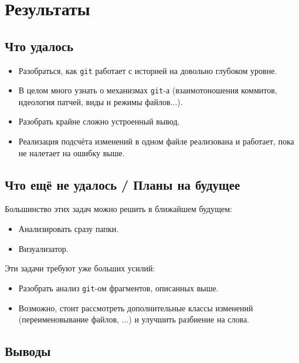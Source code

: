 \documentclass{beamer}
\makeatletter
\newcommand*{\currentname}{\@currentlabelname}
\def\t{\texttt}
\makeatother
\begin{document}
\section{Результаты}
\subsection{Что удалось}

\begin{frame}[t]{\currentname}
	\pause
	\begin{itemize}
	\item
		Разобраться, как \t{git} работает с историей на довольно глубоком уровне.
		\pause
	\item
		В целом много узнать о механизмах \t{git}-а (взаимотоношения коммитов, идеология патчей, виды и режимы файлов...).
		\pause
	\item
		Разобрать крайне сложно устроенный вывод.
		\pause
	\item
		Реализация подсчёта изменений в одном файле реализована и работает, пока не налетает на ошибку выше.
	\end{itemize}
\end{frame}

\subsection{Что ещё не удалось / Планы на будущее}

\begin{frame}[t]{\currentname}
	Большинство этих задач можно решить в ближайшем будущем:
	\pause
	\begin{itemize}
	\item
		Анализировать сразу папки.
		\pause
	\item
		Визуализатор.
	\end{itemize}
	\pause
	Эти задачи требуют уже больших усилий:
	\begin{itemize}
	\item
		Разобрать анализ \t{git}-ом фрагментов, описанных выше.
		\pause
	\item
		Возможно, стоит рассмотреть дополнительные классы изменений (переименовывание файлов, ...) и улучшить разбиение на слова.
	\end{itemize}
\end{frame}

\subsection{Выводы}
\end{document}
